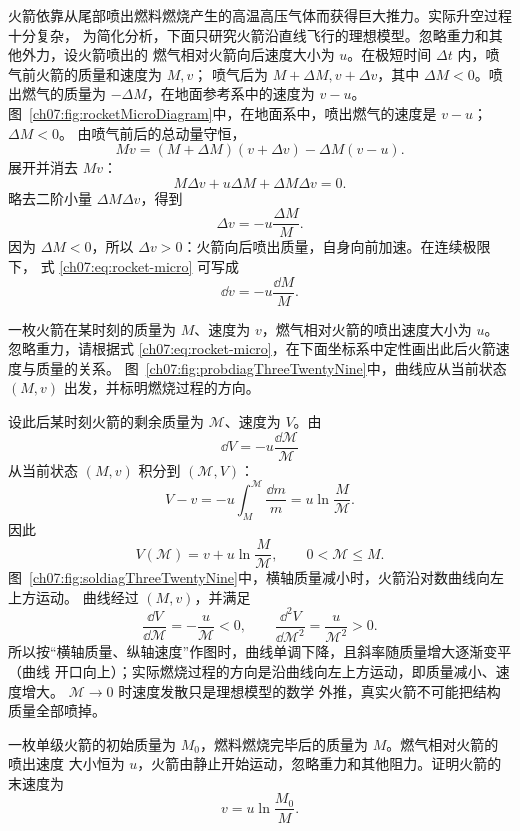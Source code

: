 {火箭依靠从尾部喷出燃料燃烧产生的高温高压气体而获得巨大推力。实际升空过程十分复杂，
为简化分析，下面只研究火箭沿直线飞行的理想模型。忽略重力和其他外力，设火箭喷出的
燃气相对火箭向后速度大小为 $u$。在极短时间 $\Delta t$ 内，喷气前火箭的质量和速度为 $M,v$；
喷气后为 $M+\Delta M,v+\Delta v$，其中 $\Delta M<0$。喷出燃气的质量为
$-\Delta M$，在地面参考系中的速度为 $v-u$。
图~\ref{ch07:fig:rocketMicroDiagram}中，在地面系中，喷出燃气的速度是 $v-u$；$\Delta M<0$。
\rocketMicroDiagram
由喷气前后的总动量守恒，
\[
 Mv=(M+\Delta M)(v+\Delta v)-\Delta M(v-u).
\]
展开并消去 $Mv$：
\[
 M\Delta v+u\Delta M+\Delta M\Delta v=0.
\]
略去二阶小量 $\Delta M\Delta v$，得到
\begin{equation}
 \label{ch07:eq:rocket-micro}
 \Delta v=-u\frac{\Delta M}{M}.
\end{equation}
因为 $\Delta M<0$，所以 $\Delta v>0$：火箭向后喷出质量，自身向前加速。在连续极限下，
式 \eqref{ch07:eq:rocket-micro} 可写成
\[
 \dd v=-u\frac{\dd M}{M}.
\]

\begin{origexamplebox}{}\label{ch07:ex:s09-3-29}
一枚火箭在某时刻的质量为 $M$、速度为 $v$，燃气相对火箭的喷出速度大小为 $u$。
忽略重力，请根据式 \eqref{ch07:eq:rocket-micro}，在下面坐标系中定性画出此后火箭速度与质量的关系。
图~\ref{ch07:fig:probdiagThreeTwentyNine}中，曲线应从当前状态 $(M,v)$ 出发，并标明燃烧过程的方向。
\probdiagThreeTwentyNine
\end{origexamplebox}

\begin{xesolution}
设此后某时刻火箭的剩余质量为 $\mathcal M$、速度为 $V$。由
\[
 \dd V=-u\frac{\dd\mathcal M}{\mathcal M}
\]
从当前状态 $(M,v)$ 积分到 $(\mathcal M,V)$：
\[
 V-v=-u\int_M^{\mathcal M}\frac{\dd m}{m}
 =u\ln\frac{M}{\mathcal M}.
\]
因此
\[
 \boxed{V(\mathcal M)=v+u\ln\frac{M}{\mathcal M}},
 \qquad 0<\mathcal M\le M.
\]
图~\ref{ch07:fig:soldiagThreeTwentyNine}中，横轴质量减小时，火箭沿对数曲线向左上方运动。
\soldiagThreeTwentyNine
曲线经过 $(M,v)$，并满足
\[
 \frac{\dd V}{\dd\mathcal M}=-\frac{u}{\mathcal M}<0,
 \qquad
 \frac{\dd^2V}{\dd\mathcal M^2}
 =\frac{u}{\mathcal M^2}>0.
\]
所以按“横轴质量、纵轴速度”作图时，曲线单调下降，且斜率随质量增大逐渐变平（曲线
开口向上）；实际燃烧过程的方向是沿曲线向左上方运动，即质量减小、速度增大。
$\mathcal M\to0$ 时速度发散只是理想模型的数学
外推，真实火箭不可能把结构质量全部喷掉。
\end{xesolution}

\begin{origexamplebox}{}\label{ch07:ex:s09-3-30}
一枚单级火箭的初始质量为 $M_0$，燃料燃烧完毕后的质量为 $M$。燃气相对火箭的喷出速度
大小恒为 $u$，火箭由静止开始运动，忽略重力和其他阻力。证明火箭的末速度为
\[
 v=u\ln\frac{M_0}{M}.
\]


\end{origexamplebox}}

